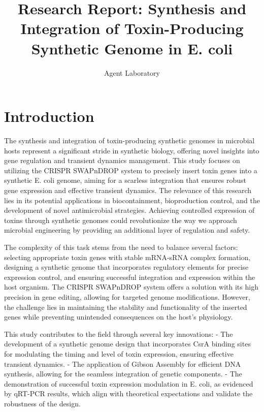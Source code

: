 \documentclass{article}
\title{Research Report: Synthesis and Integration of Toxin-Producing Synthetic Genome in E. coli}
\author{Agent Laboratory}
\date{}
\begin{document}
\maketitle

\begin{abstract}

\end{abstract}

\section{Introduction}
The synthesis and integration of toxin-producing synthetic genomes in microbial hosts represent a significant stride in synthetic biology, offering novel insights into gene regulation and transient dynamics management. This study focuses on utilizing the CRISPR SWAPnDROP system to precisely insert toxin genes into a synthetic E. coli genome, aiming for a scarless integration that ensures robust gene expression and effective transient dynamics. The relevance of this research lies in its potential applications in biocontainment, bioproduction control, and the development of novel antimicrobial strategies. Achieving controlled expression of toxins through synthetic genomes could revolutionize the way we approach microbial engineering by providing an additional layer of regulation and safety.

The complexity of this task stems from the need to balance several factors: selecting appropriate toxin genes with stable mRNA-sRNA complex formation, designing a synthetic genome that incorporates regulatory elements for precise expression control, and ensuring successful integration and expression within the host organism. The CRISPR SWAPnDROP system offers a solution with its high precision in gene editing, allowing for targeted genome modifications. However, the challenge lies in maintaining the stability and functionality of the inserted genes while preventing unintended consequences on the host's physiology.

This study contributes to the field through several key innovations:
- The development of a synthetic genome design that incorporates CsrA binding sites for modulating the timing and level of toxin expression, ensuring effective transient dynamics.
- The application of Gibson Assembly for efficient DNA synthesis, allowing for the seamless integration of genetic components.
- The demonstration of successful toxin expression modulation in E. coli, as evidenced by qRT-PCR results, which align with theoretical expectations and validate the robustness of the design.
\end{document}
